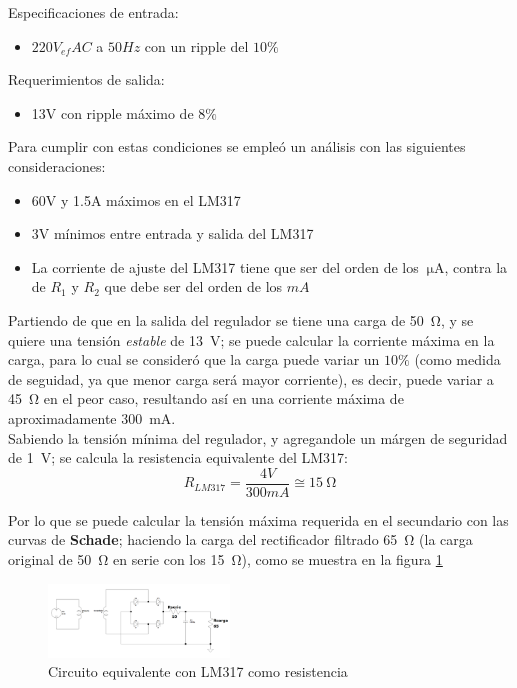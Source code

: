 \documentclass[letterpaper, 10 pt, conference]{ieeeconf}  %
\begin{document}
Especificaciones de entrada:
\begin{itemize}
  \item{$220V_{ef} AC$ a $50Hz$ con un ripple del $10\%$}
\end{itemize}
Requerimientos de salida:
\begin{itemize}
  \item{13V con ripple máximo de $8\%$}
\end{itemize}

Para cumplir con estas condiciones se empleó un análisis con las siguientes consideraciones:
\begin{itemize}
  \item{60V y 1.5A máximos en el LM317}
  \item{3V mínimos entre entrada y salida del LM317}
  \item{La corriente de ajuste del LM317 tiene que ser del orden de los $\qty{}{\micro\ampere}$, contra la de $R_1$ y $R_2$ que debe ser del orden de los $mA$}
\end{itemize}

Partiendo de que en la salida del regulador se tiene una carga de \qty{50}{\ohm}, y se quiere una tensión \textit{estable} de \qty{13}{\volt}; se puede calcular la corriente máxima en la carga, para lo cual se consideró que la carga puede variar un $10\%$ (como medida de seguidad, ya que menor carga será mayor corriente), es decir, puede variar a \qty{45}{\ohm} en el peor caso, resultando así en una corriente máxima de aproximadamente \qty{300}{\milli\ampere}. \\
Sabiendo la tensión mínima del regulador, y agregandole un márgen de seguridad de \qty{1}{\volt}; se calcula la resistencia equivalente del LM317: 
\begin{equation} \label{eq:lm317_resistance}
  R_{LM317} = \frac{4V}{300mA} \cong \qty{15}{\ohm}
\end{equation}

Por lo que se puede calcular la tensión máxima requerida en el secundario con las curvas de \textbf{Schade}; haciendo la carga del rectificador filtrado \qty{65}{\ohm} (la carga original de \qty{50}{\ohm} en serie con los \qty{15}{\ohm}), como se muestra en la figura \ref{fig:lm317_como_resistencia}
\begin{figure}[H]
  \centering
  \includegraphics[width=0.43\textwidth]{./imagenes/circ_eq_lm137_carga.png}
  \caption{Circuito equivalente con LM317 como resistencia}
  \label{fig:lm317_como_resistencia}
\end{figure}
\end{document}
